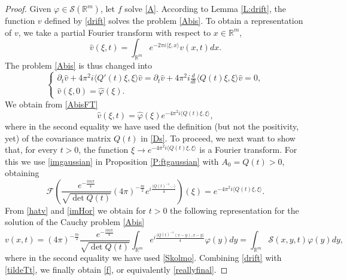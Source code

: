 \documentclass[10pt,a4paper]{amsart}
\def \So {\mathscr{S}(\Rm)}
\newcommand{\Rm}{\mathbb R^m}
\newcommand{\da}{\rangle}
\newcommand{\p}{\partial}
\newcommand{\sa}{\langle}
\newcommand{\vf}{\varphi}
\begin{document}
\begin{proof}
Given $\vf\in \So$, let $f$ solve \eqref{A}. According to Lemma \ref{L:drift}, the function $v$ defined by \eqref{drift} solves the problem \eqref{Abis}. To obtain a representation of $v$, we take a partial Fourier transform with respect to $x\in \Rm$,
\[
\hat v(\xi,t) = \int_{\Rm} e^{-2\pi i\sa \xi,x\da} v(x,t) dx.
\]
The problem \eqref{Abis} is thus changed into
\begin{equation}\label{AbisFT}
\begin{cases}
\p_t \hat v + 4\pi^2 i \sa Q'(t) \xi,\xi\da \hat v = \p_t \hat v + 4\pi^2 i \frac{d}{dt} \sa Q(t) \xi,\xi\da \hat v = 0,
\\
\hat v(\xi,0) = \hat \vf(\xi).
\end{cases}
\end{equation} 
We obtain from \eqref{AbisFT}
\begin{equation}\label{hatv}
\hat v(\xi,t) = \hat \vf(\xi) e^{-4\pi^2 i \sa Q(t) \xi,\xi\da},
\end{equation}
where in the second equality we have used the definition (but not the positivity, yet) of the covariance matrix $Q(t)$ in \eqref{Ds}. To proceed, we next want to show that, for every $t>0$, the function $\xi\to e^{-4\pi^2 i  \sa Q(t) \xi,\xi\da}$ is a Fourier transform. 
For this we use \eqref{imgaussian}  in Proposition \ref{P:ftgaussian} with $A_0 = Q(t)>0$, obtaining
\begin{equation}\label{imHor}
\mathscr F\left(\frac{e^{-\frac{i m\pi}4}}{\sqrt{\det{Q(t)}}}(4\pi
)^{-\frac{m}{2}} e^{i \frac{\sa Q(t)^{-1}\cdot,\cdot\da}{4}}\right)(\xi) =
e^{- 4 \pi^2 i \sa Q(t)\xi,\xi\da}.
\end{equation}
From \eqref{hatv} and \eqref{imHor} we obtain for $t>0$ the following representation for the solution of the Cauchy problem \eqref{Abis} 
\begin{equation}\label{tildeTt}
v(x,t)  = (4\pi
)^{-\frac{m}{2}} \frac{e^{-\frac{i m\pi}4}}{\sqrt{\det Q(t)}} \int_{\Rm}  e^{i \frac{\sa Q(t)^{-1}(x-y),x-y\da}{4}} \vf(y) dy = \int_{\Rm} \mathcal S(x,y,t) \vf(y) dy,
\end{equation}
where in the second equality we have used \eqref{Skolmo}.
Combining \eqref{drift} with \eqref{tildeTt}, we finally obtain \eqref{f}, or equivalently \eqref{reallyfinal}. 


\end{proof}
\end{document}
